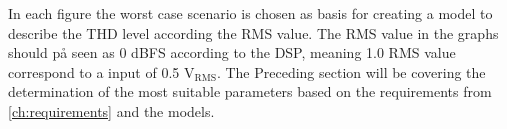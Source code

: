 In each figure the worst case scenario is chosen as basis for creating a model to describe the THD level according the RMS value. The RMS value in the graphs should på seen as 0 dBFS according to the DSP, meaning 1.0 RMS value correspond to a input of 0.5 $\text{V}_\text{RMS}$. The Preceding section will be covering the determination of the most suitable parameters based on the requirements from \autoref{ch:requirements} and the models. 










%